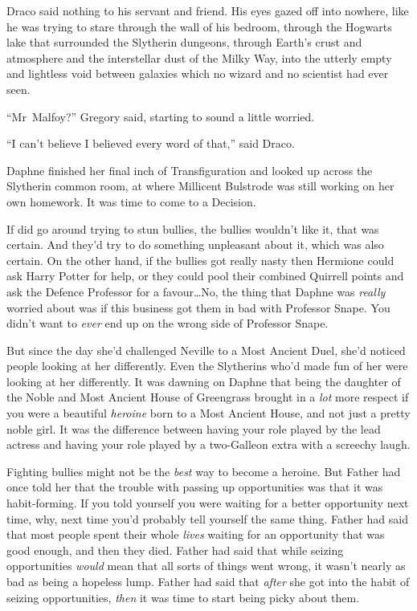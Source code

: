 Draco said nothing to his servant and friend. His eyes gazed off into nowhere, like he was trying to stare through the wall of his bedroom, through the Hogwarts lake that surrounded the Slytherin dungeons, through Earth’s crust and atmosphere and the interstellar dust of the Milky Way, into the utterly empty and lightless void between galaxies which no wizard and no scientist had ever seen.

“Mr~Malfoy?” Gregory said, starting to sound a little worried.

“I can’t believe I believed every word of that,” said Draco.

\later

Daphne finished her final inch of Transfiguration and looked up across the Slytherin common room, at where Millicent Bulstrode was still working on her own homework. It was time to come to a Decision.

If \SPHEW did go around trying to stun bullies, the bullies wouldn’t like it, that was certain. And they’d try to do something unpleasant about it, which was also certain. On the other hand, if the bullies got really nasty then Hermione could ask Harry Potter for help, or they could pool their combined Quirrell points and ask the Defence Professor for a favour…No, the thing that Daphne was \emph{really} worried about was if this business got them in bad with Professor Snape. You didn’t want to \emph{ever} end up on the wrong side of Professor Snape.

But since the day she’d challenged Neville to a Most Ancient Duel, she’d noticed people looking at her differently. Even the Slytherins who’d made fun of her were looking at her differently. It was dawning on Daphne that being the daughter of the Noble and Most Ancient House of Greengrass brought in a \emph{lot} more respect if you were a beautiful \emph{heroine} born to a Most Ancient House, and not just a pretty noble girl. It was the difference between having your role played by the lead actress and having your role played by a two-Galleon extra with a screechy laugh.

Fighting bullies might not be the \emph{best} way to become a heroine. But Father had once told her that the trouble with passing up opportunities was that it was habit-forming. If you told yourself you were waiting for a better opportunity next time, why, next time you’d probably tell yourself the same thing. Father had said that most people spent their whole \emph{lives} waiting for an opportunity that was good enough, and then they died. Father had said that while seizing opportunities \emph{would} mean that all sorts of things went wrong, it wasn’t nearly as bad as being a hopeless lump. Father had said that \emph{after} she got into the habit of seizing opportunities, \emph{then} it was time to start being picky about them.


